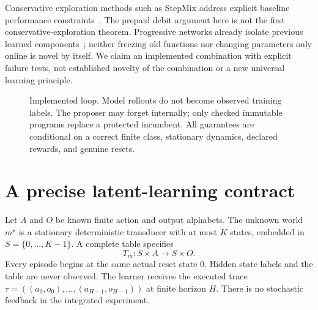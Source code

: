 \documentclass[10pt,twocolumn]{article}
\begin{document}
Conservative exploration methods such as StepMix address explicit baseline
performance constraints~\cite{stepmix}. The prepaid debit argument here is not
the first conservative-exploration theorem. Progressive networks already isolate
previous learned components~\cite{progressive}; neither freezing old functions
nor changing parameters only online is novel by itself. We claim an implemented
combination with explicit failure tests, not established novelty of the
combination or a new universal learning principle.

\begin{figure}[t]
\centering
{}
\caption{Implemented loop. Model rollouts do not become observed training labels.
The proposer may forget internally; only checked immutable programs replace a
protected incumbent. All guarantees are conditional on a correct finite class,
stationary dynamics, declared rewards, and genuine resets.}
\label{fig:loop}
\end{figure}

\section{A precise latent-learning contract}
Let $A$ and $O$ be known finite action and output alphabets. The unknown world
$m^\star$ is a stationary deterministic transducer with at most $K$ states,
embedded in $S=\{0,\ldots,K-1\}$. A complete table specifies
\begin{equation}
 T_m:S\times A\longrightarrow S\times O.
\end{equation}
Every episode begins at the same actual reset state $0$. Hidden state labels and
the table are never observed. The learner receives the executed trace
$\tau=((a_0,o_0),\ldots,(a_{H-1},o_{H-1}))$ at finite horizon $H$.
There is no stochastic feedback in the integrated experiment.
\end{document}
